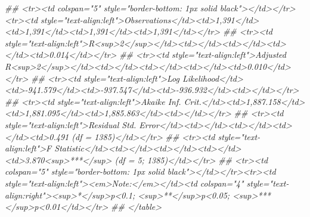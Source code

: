 \documentclass[
]{article}
\newenvironment{Shaded}{\begin{snugshade}}{\end{snugshade}}
\newcommand{\CommentTok}[1]{\textcolor[rgb]{0.56,0.35,0.01}{\textit{#1}}}
\begin{document}
\begin{Shaded}
\begin{Highlighting}[]
{{{{{{{{{{{{\CommentTok{## <tr><td colspan="5" style="border-bottom: 1px solid black"></td></tr><tr><td style="text-align:left">Observations</td><td>1,391</td><td>1,391</td><td>1,391</td><td>1,391</td></tr>}
\CommentTok{## <tr><td style="text-align:left">R<sup>2</sup></td><td></td><td></td><td></td><td>0.014</td></tr>}
\CommentTok{## <tr><td style="text-align:left">Adjusted R<sup>2</sup></td><td></td><td></td><td></td><td>0.010</td></tr>}
\CommentTok{## <tr><td style="text-align:left">Log Likelihood</td><td>-941.579</td><td>-937.547</td><td>-936.932</td><td></td></tr>}
\CommentTok{## <tr><td style="text-align:left">Akaike Inf. Crit.</td><td>1,887.158</td><td>1,881.095</td><td>1,885.863</td><td></td></tr>}
\CommentTok{## <tr><td style="text-align:left">Residual Std. Error</td><td></td><td></td><td></td><td>0.491 (df = 1385)</td></tr>}
\CommentTok{## <tr><td style="text-align:left">F Statistic</td><td></td><td></td><td></td><td>3.870<sup>***</sup> (df = 5; 1385)</td></tr>}
\CommentTok{## <tr><td colspan="5" style="border-bottom: 1px solid black"></td></tr><tr><td style="text-align:left"><em>Note:</em></td><td colspan="4" style="text-align:right"><sup>*</sup>p<0.1; <sup>**</sup>p<0.05; <sup>***</sup>p<0.01</td></tr>}
\CommentTok{## </table>}




}}}}}}}}}}}}
\end{Highlighting}
\end{Shaded}
\end{document}

